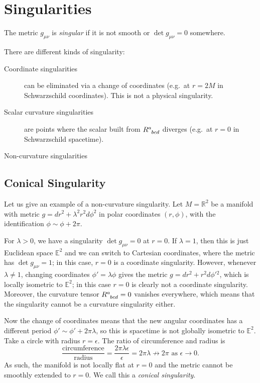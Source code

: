 \section{Singularities}%
\label{sec:singularities}

\begin{definition}[singular]
  The metric $g_{\mu\nu}$ is \emph{singular} if it is not smooth or $\det g_{\mu\nu} = 0$ somewhere.
\end{definition} 
There are different kinds of singularity:
\begin{description}
  \item[Coordinate singularities] can be eliminated via a change of coordinates (e.g.~at $r = 2M$ in Schwarzschild coordinates). This is not a physical singularity.
  \item[Scalar curvature singularities] are points where the scalar built from $R\indices{^{a}_{bcd}}$ diverges (e.g.~at $r = 0$ in Schwarzschild spacetime).
  \item[Non-curvature singularities] 
\end{description}

\subsection{Conical Singularity}%

Let us give an example of a non-curvature singularity.
Let $M = \mathbb{R}^2$ be a manifold with metric $g = dr^2 + \lambda^2 r^2 d\phi^2$ in polar coordinates $(r, \phi)$, with the identification $\phi \sim \phi + 2\pi$.

For $\lambda >0$, we have a singularity $\det g_{\mu\nu} = 0$ at $r = 0$.
If $\lambda = 1$, then this is just Euclidean space $\mathbb{E}^2$ and we can switch to Cartesian coordinates, where the metric has $\det g_{\mu\nu} = 1$; in this case, $r = 0$ is a coordinate singularity.
However, whenever $\lambda \neq 1$, changing coordinates $\phi' = \lambda \phi$ gives the metric $g = dr^2 + r^2 d\phi'{}^2$, which is locally isometric to $\mathbb{E}^2$; in this case $r = 0$ is clearly not a coordinate singularity.
Moreover, the curvature tensor $R\indices{^{a}_{bcd}} = 0$ vanishes everywhere, which means that the singularity cannot be a curvature singularity either.

Now the change of coordinates means that the new angular coordinates has a different period $\phi' \sim \phi' + 2\pi \lambda$, so this is spacetime is not globally isometric to $\mathbb{E}^2$.  
Take a circle with radius $r = \epsilon$. The ratio of circumference and radius is 
\begin{equation}
  \frac{\text{circumference}}{\text{radius}} = \frac{2 \pi \lambda \epsilon}{\epsilon} = 2 \pi \lambda \not\longrightarrow 2 \pi \text{ as } \epsilon \to 0.
\end{equation}
As such, the manifold is not locally flat at $r = 0$ and the metric cannot be smoothly extended to $r = 0$. We call this a \emph{conical singularity}.

